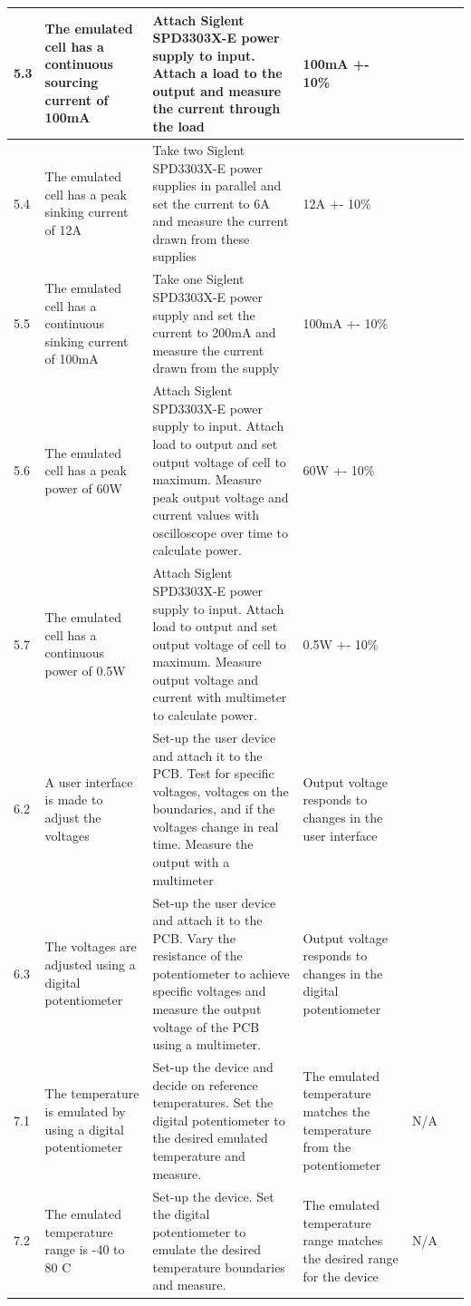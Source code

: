 \begin{table}[!ht]
\begin{tabular}{|p{0.3cm}|p{3cm}|p{7cm}|p{3cm}|p{1.5cm}|p{1cm}|}
        5.3 & The emulated cell has a continuous sourcing current of 100mA & Attach Siglent SPD3303X-E power supply to input. Attach a load to the output and measure the current through the load & 100mA +- 10\% & ~ & ~ \\ \hline
        5.4 & The emulated cell has a peak sinking current of 12A & Take two Siglent SPD3303X-E power supplies in parallel and set the current to 6A and measure the current drawn from these supplies & 12A +- 10\% & ~ & ~ \\ \hline
        5.5 & The emulated cell has a continuous sinking current of 100mA & Take one Siglent SPD3303X-E power supply and set the current to 200mA and measure the current drawn from the supply & 100mA +- 10\% & ~ & ~ \\ \hline
        5.6 & The emulated cell has a peak power of 60W & Attach Siglent SPD3303X-E power supply to input. Attach load to output and set output voltage of cell to maximum. Measure peak output voltage and current values with oscilloscope over time to calculate power.  & 60W +- 10\% & ~ & ~ \\ \hline
        5.7 & The emulated cell has a continuous power of 0.5W & Attach Siglent SPD3303X-E power supply to input. Attach load to output and set output voltage of cell to maximum. Measure output voltage and current with multimeter to calculate power.  & 0.5W +- 10\% & ~ & ~ \\ \hline
        6.2 & A user interface is made to adjust the voltages & Set-up the user device and attach it to the PCB. Test for specific voltages, voltages on the boundaries, and if the voltages change in real time. Measure the output with a multimeter  & Output voltage responds to changes in the user interface & ~ & ~ \\ \hline
        6.3 & The voltages are adjusted using a digital potentiometer & Set-up the user device and attach it to the PCB. Vary the resistance of the potentiometer to achieve specific voltages and measure the output voltage of the PCB using a multimeter.   & Output voltage responds to changes in the digital potentiometer  & ~ & ~ \\ \hline
        7.1 & The temperature is emulated by using a digital potentiometer & Set-up the device and decide on reference temperatures. Set the digital potentiometer to the desired emulated temperature and measure.  & The emulated temperature matches the temperature from the potentiometer & N/A & ~ \\ \hline
        7.2 & The emulated temperature range is -40 to 80 C & Set-up the device. Set the digital potentiometer to emulate the desired temperature boundaries and measure.  & The emulated temperature range matches the desired range for the device  & N/A & ~ \\ \hline

\end{tabular}
\end{table}
